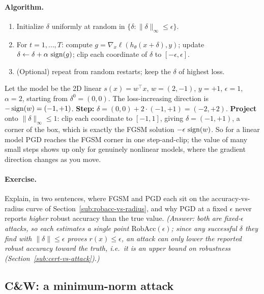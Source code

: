 \paragraph{Algorithm.}
\begin{enumerate}[label=\textbf{\arabic*.},nosep]
  \item Initialize $\delta$ uniformly at random in $\{\delta:\|\delta\|_\infty\le\epsilon\}$.
  \item For $t=1,\dots,T$: compute $g=\nabla_x\ell(h_\theta(x+\delta),y)$; update $\delta \leftarrow \delta + \alpha\,\operatorname{sign}(g)$; clip each coordinate of $\delta$ to $[-\epsilon,\epsilon]$.
  \item (Optional) repeat from random restarts; keep the $\delta$ of highest loss.
\end{enumerate}

\begin{example}
Let the model be the 2D linear $s(x)=w^\top x$, $w=(2,-1)$, $y=+1$, $\epsilon=1$, $\alpha=2$, starting from $\delta^0=(0,0)$. The loss-increasing direction is $-\operatorname{sign}(w)=(-1,+1)$. \textbf{Step:} $\delta = (0,0) + 2\cdot(-1,+1) = (-2,+2)$. \textbf{Project} onto $\|\delta\|_\infty\le1$: clip each coordinate to $[-1,1]$, giving $\delta=(-1,+1)$, a corner of the box, which is exactly the FGSM solution $-\epsilon\,\operatorname{sign}(w)$. So for a linear model PGD reaches the FGSM corner in one step-and-clip; the value of many small steps shows up only for genuinely nonlinear models, where the gradient direction changes as you move.
\end{example}

\paragraph{Exercise.} Explain, in two sentences, where FGSM and PGD each sit on the accuracy-vs-radius curve of Section~\ref{sub:robacc-vs-radius}, and why PGD at a fixed $\epsilon$ never reports \emph{higher} robust accuracy than the true value. \emph{(Answer: both are fixed-$\epsilon$ attacks, so each estimates a single point $\mathrm{RobAcc}(\epsilon)$; since any successful $\delta$ they find with $\|\delta\|\le\epsilon$ proves $r(x)\le\epsilon$, an attack can only \emph{lower} the reported robust accuracy toward the truth, i.e.\ it is an upper bound on robustness (Section~\ref{sub:cert-vs-attack}).)}

\subsection{C\&W: a minimum-norm attack}
\label{sub:cw}


